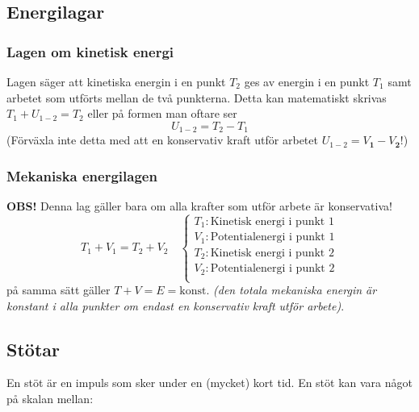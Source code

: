 \documentclass{article}
\newenvironment{ankiflashcard}[1]{}{}
\begin{document}
\begin{paracol}{2}
\subsection{Energilagar}

\begin{ankiflashcard}{Formulera lagen om kinetisk energi}
\subsubsection{Lagen om kinetisk energi}
Lagen säger att kinetiska energin i en punkt $T_2$ ges av energin i en punkt $T_1$ samt arbetet som utförts mellan de två punkterna. Detta kan matematiskt skrivas $T_1 + U_{1-2} = T_2$ eller på formen man oftare ser
$$
U_{1-2} = T_2 - T_1
$$
(Förväxla inte detta med att en konservativ kraft utför arbetet $U_{1-2}=V_{\mathbf 1}-V_{\mathbf 2}$!)
\end{ankiflashcard}
\begin{ankiflashcard}{Formulera mekaniska energilagen}
    
\subsubsection{Mekaniska energilagen}
\textbf{OBS!} Denna lag gäller bara om alla krafter som utför arbete är konservativa!
$$
T_1 + V_1 = T_2 + V_2\quad\left\{\begin{array}{l}T_1: \text{Kinetisk energi i punkt 1} \\V_1: \text{Potentialenergi i punkt 1} \\T_2: \text{Kinetisk energi i punkt 2} \\V_2: \text{Potentialenergi i punkt 2} \\\end{array}\right.$$
på samma sätt gäller
$
T + V = E = \text{konst.}
$
\textit{(den totala mekaniska energin är konstant i alla punkter om endast en konservativ kraft utför arbete)}.
\end{ankiflashcard}

\subsection{Stötar}
En stöt är en impuls som sker under en (mycket) kort tid. En stöt kan vara något på skalan mellan:

\begin{ankiflashcard}{Förklara de olika typerna av stötar som finns, hur energiförlusten ser ut och vad studstalet är.}
    

\end{ankiflashcard}
\end{paracol}
\end{document}
